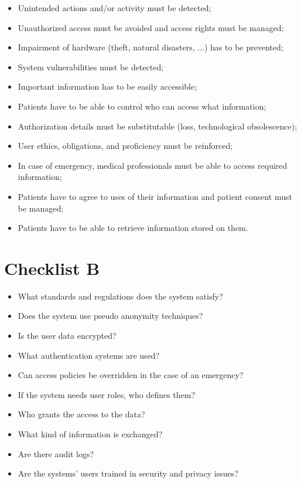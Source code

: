 \begin{itemize}
	\item Unintended actions and/or activity must be detected;
	\item Unauthorized access must be avoided and access rights must be managed;
	\item Impairment of hardware (theft, natural disasters, ...) has to be prevented;
	\item System vulnerabilities must be detected;
	\item Important information has to be easily accessible;
	\item Patients have to be able to control who can access what information;
	\item Authorization details must be substitutable (loss, technological obsolescence);
	\item User ethics, obligations, and proficiency must be reinforced;
	\item In case of emergency, medical professionals must be able to access required information;
	\item Patients have to agree to uses of their information and patient consent must be managed;
	\item Patients have to be able to retrieve information stored on them.
\end{itemize}

\section{Checklist B}
\label{security-checklists-b}

\begin{itemize}
	\item What standards and regulations does the system satisfy?
	\item Does the system use pseudo anonymity techniques?
	\item Is the user data encrypted? 
	\item What authentication systems are used? 
	\item Can access policies be overridden in the case of an emergency? 
	\item If the system needs user roles, who defines them? 
	\item Who grants the access to the data? 
	\item What kind of information is exchanged? 
	\item Are there audit logs?
	\item Are the systems' users trained in security and privacy issues? 
\end{itemize}
